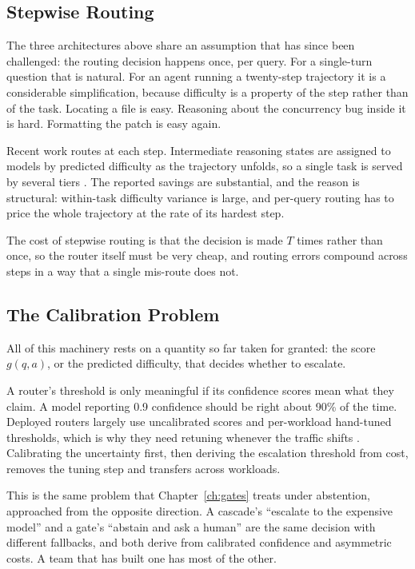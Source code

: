 \documentclass[11pt]{book}
\begin{document}
\subsection{Stepwise Routing}

The three architectures above share an assumption that has since been challenged: the routing decision happens once, per query. For a single-turn question that is natural. For an agent running a twenty-step trajectory it is a considerable simplification, because difficulty is a property of the step rather than of the task. Locating a file is easy. Reasoning about the concurrency bug inside it is hard. Formatting the patch is easy again.

Recent work routes at each step. Intermediate reasoning states are assigned to models by predicted difficulty as the trajectory unfolds, so a single task is served by several tiers \cite{policyrouting2026, confrouting2026}. The reported savings are substantial, and the reason is structural: within-task difficulty variance is large, and per-query routing has to price the whole trajectory at the rate of its hardest step.

The cost of stepwise routing is that the decision is made $T$ times rather than once, so the router itself must be very cheap, and routing errors compound across steps in a way that a single mis-route does not.

\subsection{The Calibration Problem}

All of this machinery rests on a quantity so far taken for granted: the score $g(q,a)$, or the predicted difficulty, that decides whether to escalate.

A router's threshold is only meaningful if its confidence scores mean what they claim. A model reporting 0.9 confidence should be right about 90\% of the time. Deployed routers largely use uncalibrated scores and per-workload hand-tuned thresholds, which is why they need retuning whenever the traffic shifts \cite{ucci2026}. Calibrating the uncertainty first, then deriving the escalation threshold from cost, removes the tuning step and transfers across workloads.

This is the same problem that Chapter~\ref{ch:gates} treats under abstention, approached from the opposite direction. A cascade's ``escalate to the expensive model'' and a gate's ``abstain and ask a human'' are the same decision with different fallbacks, and both derive from calibrated confidence and asymmetric costs. A team that has built one has most of the other.
\end{document}
